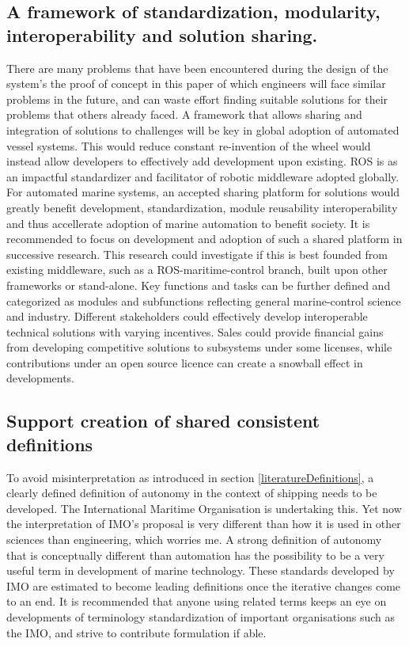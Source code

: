\subsection*{A framework of standardization, modularity, interoperability and solution sharing.}
There are many problems that have been encountered during the design of the system's the proof of concept in this paper of which engineers will face similar problems in the future, and can waste effort finding suitable solutions for their problems that others already faced. A framework that allows sharing and integration of solutions to challenges will be key in global adoption of automated vessel systems. This would reduce constant re-invention of the wheel would instead allow developers to effectively add development upon existing. ROS is  as an impactful standardizer and facilitator of robotic middleware adopted globally. For automated marine systems, an accepted sharing platform for solutions would greatly benefit development, standardization, module reusability interoperability and thus accellerate adoption of marine automation to benefit society. It is recommended to focus on development and adoption of such a shared platform in successive research. This research could investigate if this is best founded from existing middleware, such as a ROS-maritime-control branch, built upon other frameworks or stand-alone. Key functions and tasks can be further defined and categorized as modules and subfunctions reflecting general marine-control science and industry. Different stakeholders could effectively develop interoperable technical solutions with varying incentives. Sales could provide financial gains from developing competitive solutions to subsystems under some licenses, while contributions under an open source licence can create a snowball effect in developments. 

\subsection*{Support creation of shared consistent definitions}
To avoid misinterpretation as introduced in section \ref{literatureDefinitions}, a clearly defined definition of autonomy in the context of shipping needs to be developed. The International Maritime Organisation is undertaking this. Yet now the interpretation of IMO's proposal is very different than how it is used in other sciences than engineering, which worries me. A strong definition of autonomy that is conceptually different than automation has the possibility to be a very useful term in development of marine technology. These standards developed by IMO are estimated to become leading definitions once the iterative changes come to an end. It is recommended that anyone using related terms keeps an eye on developments of terminology standardization of important organisations such as the IMO, and strive to contribute formulation if able. 

